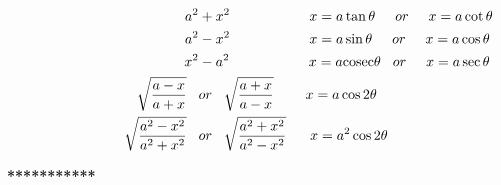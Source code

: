 \begin{align*}
\hspace{20mm} a^2 &+ x^2 \hspace{20mm} x=a\tan\theta \hspace{5mm} or \hspace{5mm} x=a\cot\theta\\
\hspace{20mm}  a^2 &- x^2  \hspace{20mm} x=a\sin\theta \hspace{5mm} or \hspace{5mm} x=a\cos\theta\\
\hspace{20mm}  x^2 &- a^2  \hspace{20mm} x=a \mathrm{cosec}\theta \hspace{3mm} or \hspace{5mm} x=a\sec\theta \\
\hspace{25mm}  \sqrt{\frac{a-x}{a+x}} \hspace{3mm}  &or \hspace{3mm}\sqrt{\frac{a+x}{a-x}}  \hspace{8mm} x=a\cos2\theta \hspace{5mm}\\
\hspace{25mm}  \sqrt{\frac{a^2-x^2}{a^2+x^2}} \hspace{3mm} &or \hspace{3mm}\sqrt{\frac{a^2+x^2}{a^2-x^2}}  \hspace{6mm} x=a^2\cos2\theta \hspace{5mm}
\end{align*}

\vspace{5mm}
\begin{center}
\textbf{***********}
\end{center}
